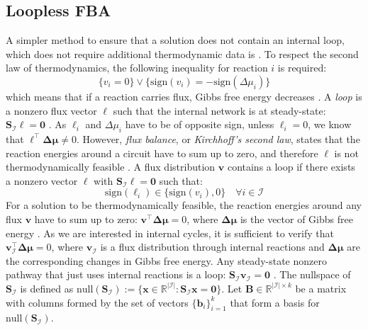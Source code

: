\subsection{Loopless FBA} \label{section:ll_fba}
A simpler method to ensure that a solution does not contain an internal loop, which does not require additional thermodynamic data is . 
To respect the second law of thermodynamics, the following inequality for reaction $i$ is required: 
\begin{equation}
    \{v_i = 0\} \lor \{\text{sign}(v_i) = - \text{sign}(\Delta \mu_i)\} 
\end{equation}
 which means that if a reaction carries flux, Gibbs free energy decreases \cite{muller_fast_2013}. 
A \textit{loop} is a nonzero flux vector $\boldsymbol \ell$ such that the internal network is at steady-state: $\mathbf S_{\mathcal{I}} \boldsymbol \ell = \mathbf 0$ \cite{noor_proof_2012}. As $\ell_i$ and $\Delta \mu_i$ have to be of opposite sign, unless $\ell_i=0$, we know that $\boldsymbol \ell^\intercal \boldsymbol{\Delta \mu} \neq 0$. %
However, \textit{flux balance}, or \textit{Kirchhoff's second law}, states that the reaction energies around a circuit have to sum up to zero, and therefore $\boldsymbol \ell$ is not thermodynamically feasible \cite{elimination_infeasible_loops}. 
A flux distribution $\mathbf v$ contains a loop if there exists a nonzero vector $\boldsymbol \ell$ with $\mathbf S_{\mathcal{I}} \boldsymbol \ell = \mathbf 0$ such that: %
\begin{equation*}
    \text{sign}(\ell_i) \in \{\text{sign}(v_i),0\} \quad \forall i \in \mathcal{I}
\end{equation*}
For a solution to be thermodynamically feasible, the reaction energies around any flux $\mathbf v$ have to sum up to zero: $\mathbf v^\intercal \boldsymbol{\Delta \mu} = 0$, where $\boldsymbol{\Delta \mu}$ is the vector of Gibbs free energy \cite{elimination_infeasible_loops}. As we are interested in internal cycles, it is sufficient to verify that $\mathbf v_\mathcal{I}^\intercal \boldsymbol{\Delta \mu} =0$, where $\mathbf v_\mathcal{I}$ is a flux distribution through internal reactions and $\boldsymbol{\Delta \mu}$ are the corresponding changes in Gibbs free energy.
Any steady-state nonzero pathway that just uses internal reactions is a loop: $\mathbf S_{\mathcal{I}} \mathbf v_{\mathcal{I}} = \mathbf 0$ \cite{noor_proof_2012}. The nullspace of $\mathbf S_{\mathcal{I}}$ is defined as $\mathrm{null}(\mathbf S_{\mathcal{I}}) := \{\mathbf x \in \mathbb{R}^{|\mathcal{I}|} : \mathbf S_{\mathcal{I}} \mathbf x = \mathbf 0 \}$. Let $\mathbf B \in \mathbb{R}^{|\mathcal{I}| \times k}$ be a matrix with columns formed by the set of vectors $\{\mathbf b_i\}_{i=1}^k$ that form a basis for $\mathrm{null}(\mathbf S_{\mathcal{I}})$.
